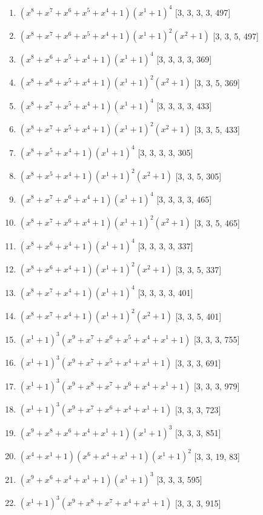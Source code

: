 \documentclass[10pt,twocolumn]{article}
\begin{document}
\begin{enumerate}
\item $(x^{8} + x^{7} + x^{6} + x^{5} + x^{4} + 1)(x^{1} + 1)^{4}$  [3, 3, 3, 3, 497]
\item $(x^{8} + x^{7} + x^{6} + x^{5} + x^{4} + 1)(x^{1} + 1)^{2}(x^{2} + 1)$  [3, 3, 5, 497]
\item $(x^{8} + x^{6} + x^{5} + x^{4} + 1)(x^{1} + 1)^{4}$  [3, 3, 3, 3, 369]
\item $(x^{8} + x^{6} + x^{5} + x^{4} + 1)(x^{1} + 1)^{2}(x^{2} + 1)$  [3, 3, 5, 369]
\item $(x^{8} + x^{7} + x^{5} + x^{4} + 1)(x^{1} + 1)^{4}$  [3, 3, 3, 3, 433]
\item $(x^{8} + x^{7} + x^{5} + x^{4} + 1)(x^{1} + 1)^{2}(x^{2} + 1)$  [3, 3, 5, 433]
\item $(x^{8} + x^{5} + x^{4} + 1)(x^{1} + 1)^{4}$  [3, 3, 3, 3, 305]
\item $(x^{8} + x^{5} + x^{4} + 1)(x^{1} + 1)^{2}(x^{2} + 1)$  [3, 3, 5, 305]
\item $(x^{8} + x^{7} + x^{6} + x^{4} + 1)(x^{1} + 1)^{4}$  [3, 3, 3, 3, 465]
\item $(x^{8} + x^{7} + x^{6} + x^{4} + 1)(x^{1} + 1)^{2}(x^{2} + 1)$  [3, 3, 5, 465]
\item $(x^{8} + x^{6} + x^{4} + 1)(x^{1} + 1)^{4}$  [3, 3, 3, 3, 337]
\item $(x^{8} + x^{6} + x^{4} + 1)(x^{1} + 1)^{2}(x^{2} + 1)$  [3, 3, 5, 337]
\item $(x^{8} + x^{7} + x^{4} + 1)(x^{1} + 1)^{4}$  [3, 3, 3, 3, 401]
\item $(x^{8} + x^{7} + x^{4} + 1)(x^{1} + 1)^{2}(x^{2} + 1)$  [3, 3, 5, 401]
\item $(x^{1} + 1)^{3}(x^{9} + x^{7} + x^{6} + x^{5} + x^{4} + x^{1} + 1)$  [3, 3, 3, 755]
\item $(x^{1} + 1)^{3}(x^{9} + x^{7} + x^{5} + x^{4} + x^{1} + 1)$  [3, 3, 3, 691]
\item $(x^{1} + 1)^{3}(x^{9} + x^{8} + x^{7} + x^{6} + x^{4} + x^{1} + 1)$  [3, 3, 3, 979]
\item $(x^{1} + 1)^{3}(x^{9} + x^{7} + x^{6} + x^{4} + x^{1} + 1)$  [3, 3, 3, 723]
\item $(x^{9} + x^{8} + x^{6} + x^{4} + x^{1} + 1)(x^{1} + 1)^{3}$  [3, 3, 3, 851]
\item $(x^{4} + x^{1} + 1)(x^{6} + x^{4} + x^{1} + 1)(x^{1} + 1)^{2}$  [3, 3, 19, 83]
\item $(x^{9} + x^{6} + x^{4} + x^{1} + 1)(x^{1} + 1)^{3}$  [3, 3, 3, 595]
\item $(x^{1} + 1)^{3}(x^{9} + x^{8} + x^{7} + x^{4} + x^{1} + 1)$  [3, 3, 3, 915]

\end{enumerate}
\end{document}
